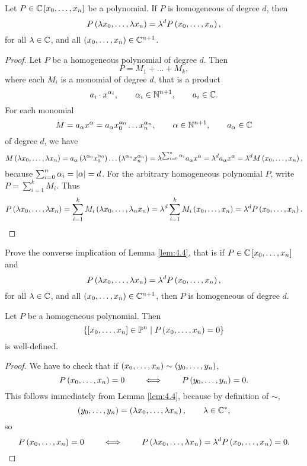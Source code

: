 \begin{lemma}
\label{lem:4.4}
Let $ P \in \mathbb{C}\left[ x_0, \dots, x_n \right] $ be a polynomial. If $ P $ is homogeneous of degree $ d $, then
$$ P\left( \lambda x_0, \dots, \lambda x_n \right) = \lambda^dP\left( x_0, \dots, x_n \right), $$ for all $ \lambda \in \mathbb{C} $, and all $ \left( x_0, \dots, x_n \right) \in \mathbb{C}^{n + 1} $.
\end{lemma}

\begin{proof}
Let $ P $ be a homogeneous polynomial of degree $ d $. Then
$$ P = M_1 + \dots + M_k, $$
where each $ M_i $ is a monomial of degree $ d $, that is a product
$$ a_i \cdot x^{\alpha_i}, \qquad \alpha_i \in \mathbb{N}^{n + 1}, \qquad a_i \in \mathbb{C}. $$
For each monomial
$$ M = a_\alpha x^\alpha = a_\alpha x_0^{\alpha_0} \dots x_n^{\alpha_n}, \qquad \alpha \in \mathbb{N}^{n + 1}, \qquad a_\alpha \in \mathbb{C} $$
of degree $ d $, we have
$$ M\left( \lambda x_0, \dots, \lambda x_n \right) = a_\alpha\left( \lambda^{\alpha_0}x_0^{\alpha_0} \right) \dots \left( \lambda^{\alpha_n}x_n^{\alpha_n} \right) = \lambda^{\sum_{i = 0}^n \alpha_i}a_\alpha x^\alpha = \lambda^da_\alpha x^\alpha = \lambda^dM\left( x_0, \dots, x_n \right), $$
because $ \sum_{i = 0}^n \alpha_i = \left\lvert \alpha \right\rvert = d $. For the arbitrary homogeneous polynomial $ P $, write $ P = \sum_{i = 1}^k M_i $. Thus
$$ P\left( \lambda x_0, \dots, \lambda x_n \right) = \sum_{i = 1}^k M_i\left( \lambda x_0, \dots, \lambda_n x_n \right) = \lambda^d\sum_{i = 1}^k M_i\left( x_0, \dots, x_n \right) = \lambda^dP\left( x_0, \dots, x_n \right). $$
\end{proof}

\begin{exercise}
Prove the converse implication of Lemma \ref{lem:4.4}, that is if $ P \in \mathbb{C}\left[ x_0, \dots, x_n \right] $ and
$$ P\left( \lambda x_0, \dots, \lambda x_n \right) = \lambda^dP\left( x_0, \dots, x_n \right), $$
for all $ \lambda \in \mathbb{C} $, and all $ \left( x_0, \dots, x_n \right) \in \mathbb{C}^{n + 1} $, then $ P $ is homogeneous of degree $ d $.
\end{exercise}

\begin{proposition}
Let $ P $ be a homogeneous polynomial. Then
$$ \left\{ \left[ x_0, \dots, x_n \right] \in \mathbb{P}^n \mid P\left( x_0, \dots, x_n \right) = 0 \right\} $$
is well-defined.
\end{proposition}

\begin{proof}
We have to check that if $ \left( x_0, \dots, x_n \right) \sim \left( y_0, \dots, y_n \right) $,
$$ P\left( x_0, \dots, x_n \right) = 0 \qquad \iff \qquad P\left( y_0, \dots, y_n \right) = 0. $$
This follows immediately from Lemma \ref{lem:4.4}, because by definition of $ \sim $,
$$ \left( y_0, \dots, y_n \right) = \left( \lambda x_0, \dots, \lambda x_n \right), \qquad \lambda \in \mathbb{C}^*, $$
so
$$ P\left( x_0, \dots, x_n \right) = 0 \qquad \iff \qquad P\left( \lambda x_0, \dots, \lambda x_n \right) = \lambda^dP\left( x_0, \dots, x_n \right) = 0. $$
\end{proof}

